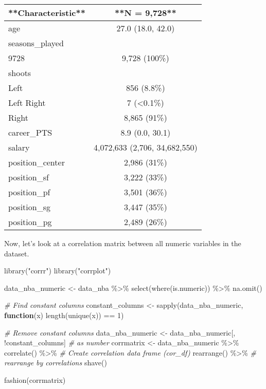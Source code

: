 \documentclass[
]{book}
\newenvironment{Shaded}{\begin{snugshade}}{\end{snugshade}}
\newcommand{\CommentTok}[1]{\textcolor[rgb]{0.56,0.35,0.01}{\textit{#1}}}
\newcommand{\ControlFlowTok}[1]{\textcolor[rgb]{0.13,0.29,0.53}{\textbf{#1}}}
\newcommand{\DecValTok}[1]{\textcolor[rgb]{0.00,0.00,0.81}{#1}}
\newcommand{\FunctionTok}[1]{\textcolor[rgb]{0.00,0.00,0.00}{#1}}
\newcommand{\NormalTok}[1]{#1}
\newcommand{\OtherTok}[1]{\textcolor[rgb]{0.56,0.35,0.01}{#1}}
\newcommand{\SpecialCharTok}[1]{\textcolor[rgb]{0.00,0.00,0.00}{#1}}
\newcommand{\StringTok}[1]{\textcolor[rgb]{0.31,0.60,0.02}{#1}}
\begin{document}
\begin{tabular}{l|c}
\hline
**Characteristic** & **N = 9,728**\\
\hline
age & 27.0 (18.0, 42.0)\\
\hline
seasons\_played & \\
\hline
9728 & 9,728 (100\%)\\
\hline
shoots & \\
\hline
Left & 856 (8.8\%)\\
\hline
Left Right & 7 (<0.1\%)\\
\hline
Right & 8,865 (91\%)\\
\hline
career\_PTS & 8.9 (0.0, 30.1)\\
\hline
salary & 4,072,633 (2,706, 34,682,550)\\
\hline
position\_center & 2,986 (31\%)\\
\hline
position\_sf & 3,222 (33\%)\\
\hline
position\_pf & 3,501 (36\%)\\
\hline
position\_sg & 3,447 (35\%)\\
\hline
position\_pg & 2,489 (26\%)\\
\hline
\end{tabular}

Now, let's look at a correlation matrix between all numeric
variables in the dataset.

\begin{Shaded}
\begin{Highlighting}[]
\FunctionTok{library}\NormalTok{(}\StringTok{"corrr"}\NormalTok{)}
\FunctionTok{library}\NormalTok{(}\StringTok{"corrplot"}\NormalTok{)}

\NormalTok{data\_nba\_numeric }\OtherTok{\textless{}{-}}\NormalTok{ data\_nba }\SpecialCharTok{\%\textgreater{}\%}
  \FunctionTok{select}\NormalTok{(}\FunctionTok{where}\NormalTok{(is.numeric)) }\SpecialCharTok{\%\textgreater{}\%}
  \FunctionTok{na.omit}\NormalTok{()}

\CommentTok{\# Find constant columns}
\NormalTok{constant\_columns }\OtherTok{\textless{}{-}} \FunctionTok{sapply}\NormalTok{(data\_nba\_numeric, }\ControlFlowTok{function}\NormalTok{(x) }\FunctionTok{length}\NormalTok{(}\FunctionTok{unique}\NormalTok{(x)) }\SpecialCharTok{==} \DecValTok{1}\NormalTok{)}

\CommentTok{\# Remove constant columns}
\NormalTok{data\_nba\_numeric }\OtherTok{\textless{}{-}}\NormalTok{ data\_nba\_numeric[, }\SpecialCharTok{!}\NormalTok{constant\_columns]}
\CommentTok{\# as number}
\NormalTok{corrmatrix }\OtherTok{\textless{}{-}}\NormalTok{ data\_nba\_numeric }\SpecialCharTok{\%\textgreater{}\%}
  \FunctionTok{correlate}\NormalTok{() }\SpecialCharTok{\%\textgreater{}\%}    \CommentTok{\# Create correlation data frame (cor\_df)}
  \FunctionTok{rearrange}\NormalTok{() }\SpecialCharTok{\%\textgreater{}\%}  \CommentTok{\# rearrange by correlations}
  \FunctionTok{shave}\NormalTok{() }

\FunctionTok{fashion}\NormalTok{(corrmatrix)}
\end{Highlighting}
\end{Shaded}
\end{document}
